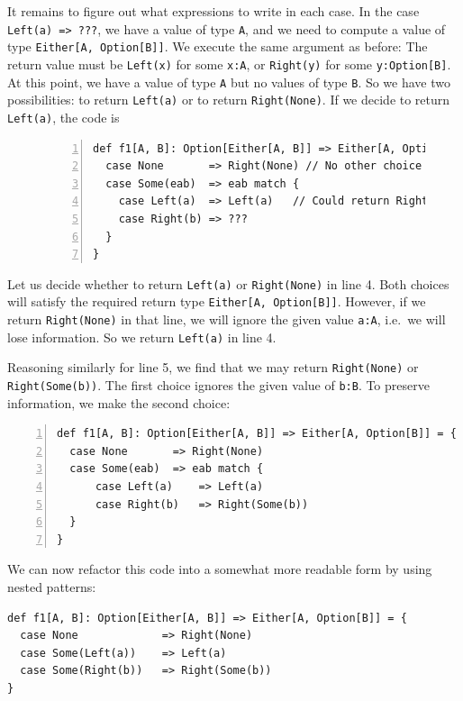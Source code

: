 \noindent It remains to figure out what expressions to write in each
case. In the case \lstinline!Left(a) => ???!, we have a value of
type \lstinline!A!, and we need to compute a value of type \lstinline!Either[A, Option[B]]!.
We execute the same argument as before: The return value must be \lstinline!Left(x)!
for some \lstinline!x:A!, or \lstinline!Right(y)! for some \lstinline!y:Option[B]!.
At this point, we have a value of type \lstinline!A! but no values
of type \lstinline!B!. So we have two possibilities: to return \lstinline!Left(a)!
or to return \lstinline!Right(None)!. If we decide to return \lstinline!Left(a)!,
the code is

\begin{figure}%
\vspace{-0.6\baselineskip}
\begin{lstlisting}[numbers=left]
def f1[A, B]: Option[Either[A, B]] => Either[A, Option[B]] = {
  case None       => Right(None) // No other choice here.
  case Some(eab)  => eab match {
    case Left(a)  => Left(a)   // Could return Right(None) here.
    case Right(b) => ???
  }
}
\end{lstlisting}

\vspace{-0.8\baselineskip}
\end{figure}%

\noindent Let us decide whether to return \lstinline!Left(a)! or
\lstinline!Right(None)! in line 4. Both choices will satisfy the
required return type \lstinline!Either[A, Option[B]]!. However, if
we return \lstinline!Right(None)! in that line, we will ignore the
given value \lstinline!a:A!, i.e.~we will lose information.
So we return \lstinline!Left(a)! in line 4.

Reasoning similarly for line 5, we find that we may return \lstinline!Right(None)!
or \lstinline!Right(Some(b))!. The first choice ignores the given
value of \lstinline!b:B!. To preserve information, we make the second
choice:
\begin{lstlisting}[numbers=left]
def f1[A, B]: Option[Either[A, B]] => Either[A, Option[B]] = {
  case None       => Right(None)
  case Some(eab)  => eab match {
      case Left(a)    => Left(a)
      case Right(b)   => Right(Some(b))
  }
}
\end{lstlisting}

We can now refactor this code into a somewhat more readable form by
using nested patterns: 
\begin{lstlisting}
def f1[A, B]: Option[Either[A, B]] => Either[A, Option[B]] = {
  case None             => Right(None)
  case Some(Left(a))    => Left(a)
  case Some(Right(b))   => Right(Some(b))
}
\end{lstlisting}



